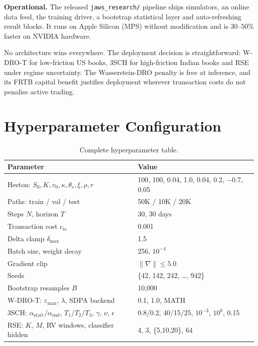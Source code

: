 \documentclass[11pt,oneside]{report}
\begin{document}
\textbf{Operational.} The released \texttt{jaws\_research/} pipeline ships simulators, an online data feed, the training driver, a bootstrap statistical layer and auto-refreshing result blocks. It runs on Apple Silicon (MPS) without modification and is $30$--$50\%$ faster on NVIDIA hardware.

No architecture wins everywhere. The deployment decision is straightforward: W-DRO-T for low-friction US books, 3SCH for high-friction Indian books and RSE under regime uncertainty. The Wasserstein-DRO penalty is free at inference, and its FRTB capital benefit justifies deployment wherever transaction costs do not penalise active trading.


\appendix

\chapter{Hyperparameter Configuration}
\label{app:hyper}

\begin{table}[H]
\centering\small
\caption{Complete hyperparameter table.}
\begin{tabular}{@{}ll@{}}
\toprule
\textbf{Parameter} & \textbf{Value} \\\midrule
Heston: $S_0, K, v_0, \kappa, \theta_v, \xi, \rho, r$ & 100, 100, 0.04, 1.0, 0.04, 0.2, $-$0.7, 0.05 \\
Paths: train / val / test & 50K / 10K / 20K \\
Steps $N$, horizon $T$ & 30, 30 days \\
Transaction cost $c_{\mathrm{tc}}$ & 0.001 \\
Delta clamp $\delta_{\max}$ & 1.5 \\
Batch size, weight decay & 256, $10^{-4}$ \\
Gradient clip & $\|\nabla\| \leq 5.0$ \\
Seeds & \{42, 142, 242, \ldots, 942\} \\
Bootstrap resamples $B$ & 10,000 \\
W-DRO-T: $\varepsilon_{\max}$, $\lambda$, SDPA backend & 0.1, 1.0, MATH \\
3SCH: $\alpha_{\text{start}}/\alpha_{\text{end}}$, $T_1/T_2/T_3$, $\gamma$, $\nu$, $\epsilon$ & 0.8/0.2, 40/15/25, $10^{-3}$, $10^8$, 0.15 \\
RSE: $K$, $M$, RV windows, classifier hidden & 4, 3, \{5,10,20\}, 64 \\
\bottomrule
\end{tabular}
\end{table}
\end{document}
